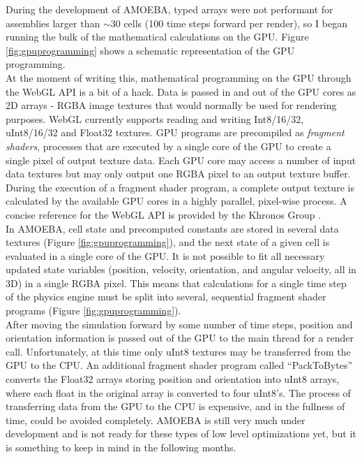 {During the development of AMOEBA, typed arrays \cite{Network} were not performant for assemblies larger than $\sim$30 cells (100 time steps forward per render), so I began running the bulk of the mathematical calculations on the GPU.  Figure \ref{fig:gpuprogramming} shows a schematic representation of the GPU programming.\\

At the moment of writing this, mathematical programming on the GPU through the WebGL API is a bit of a hack.  Data is passed in and out of the GPU cores as 2D arrays - RGBA image textures that would normally be used for rendering purposes.  WebGL currently supports reading and writing Int8/16/32, uInt8/16/32 and Float32 textures.  GPU programs are precompiled as \textit{fragment shaders}, processes that are executed by a single core of the GPU to create a single pixel of output texture data.  Each GPU core may access a number of input data textures but may only output one RGBA pixel to an output texture buffer.  During the execution of a fragment shader program, a complete output texture is calculated by the available GPU cores in a highly parallel, pixel-wise process.  A concise reference for the WebGL API is provided by the Khronos Group \cite{Group}.\\

In AMOEBA, cell state and precomputed constants are stored in several data textures (Figure \ref{fig:gpuprogramming}), and the next state of a given cell is evaluated in a single core of the GPU.  It is not possible to fit all necessary updated state variables (position, velocity, orientation, and angular velocity, all in 3D) in a single RGBA pixel.  This means that calculations for a single time step of the physics engine must be split into several, sequential fragment shader programs (Figure \ref{fig:gpuprogramming}).\\

After moving the simulation forward by some number of time steps, position and orientation information is passed out of the GPU to the main thread for a render call.  Unfortunately, at this time only uInt8 textures may be transferred from the GPU to the CPU.  An additional fragment shader program called ``PackToBytes'' converts the Float32 arrays storing position and orientation into uInt8 arrays, where each float in the original array is converted to four uInt8's.  The process of transferring data from the GPU to the CPU is expensive, and in the fullness of time, could be avoided completely.  AMOEBA is still very much under development and is not ready for these types of low level optimizations yet, but it is something to keep in mind in the following months.\\

}

